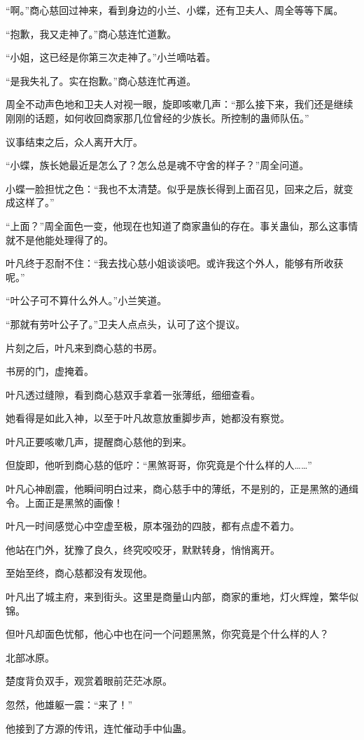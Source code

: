 \begin{this_body}
“啊。”商心慈回过神来，看到身边的小兰、小蝶，还有卫夫人、周全等等下属。

“抱歉，我又走神了。”商心慈连忙道歉。

“小姐，这已经是你第三次走神了。”小兰嘀咕着。

“是我失礼了。实在抱歉。”商心慈连忙再道。

周全不动声色地和卫夫人对视一眼，旋即咳嗽几声：“那么接下来，我们还是继续刚刚的话题，如何收回商家那几位曾经的少族长。所控制的蛊师队伍。”

议事结束之后，众人离开大厅。

“小蝶，族长她最近是怎么了？怎么总是魂不守舍的样子？”周全问道。

小蝶一脸担忧之色：“我也不太清楚。似乎是族长得到上面召见，回来之后，就变成这样了。”

“上面？”周全面色一变，他现在也知道了商家蛊仙的存在。事关蛊仙，那么这事情就不是他能处理得了的。

叶凡终于忍耐不住：“我去找心慈小姐谈谈吧。或许我这个外人，能够有所收获呢。”

“叶公子可不算什么外人。”小兰笑道。

“那就有劳叶公子了。”卫夫人点点头，认可了这个提议。

片刻之后，叶凡来到商心慈的书房。

书房的门，虚掩着。

叶凡透过缝隙，看到商心慈双手拿着一张薄纸，细细查看。

她看得是如此入神，以至于叶凡故意放重脚步声，她都没有察觉。

叶凡正要咳嗽几声，提醒商心慈他的到来。

但旋即，他听到商心慈的低咛：“黑煞哥哥，你究竟是个什么样的人……”

叶凡心神剧震，他瞬间明白过来，商心慈手中的薄纸，不是别的，正是黑煞的通缉令。上面正是黑煞的画像！

叶凡一时间感觉心中空虚至极，原本强劲的四肢，都有点虚不着力。

他站在门外，犹豫了良久，终究咬咬牙，默默转身，悄悄离开。

至始至终，商心慈都没有发现他。

叶凡出了城主府，来到街头。这里是商量山内部，商家的重地，灯火辉煌，繁华似锦。

但叶凡却面色忧郁，他心中也在问一个问题黑煞，你究竟是个什么样的人？

北部冰原。

楚度背负双手，观赏着眼前茫茫冰原。

忽然，他雄躯一震：“来了！”

他接到了方源的传讯，连忙催动手中仙蛊。


\end{this_body}
